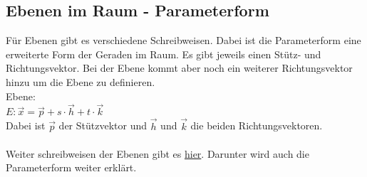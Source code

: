 \subsection{Ebenen im Raum - Parameterform}
Für Ebenen gibt es verschiedene Schreibweisen. 
Dabei ist die Parameterform eine erweiterte Form der Geraden im Raum.
Es gibt jeweils einen Stütz- und Richtungsvektor. 
Bei der Ebene kommt aber noch ein weiterer Richtungsvektor hinzu um die Ebene zu definieren.
\\
Ebene: \\
$
E: \vec{x} = 
\vec{p} + s\cdot\vec{h} + t\cdot\vec{k}
$
\\
Dabei ist $\vec{p}$ der Stützvektor und $\vec{h}$ und $\vec{k}$ die beiden Richtungsvektoren.
\\\\
Weiter schreibweisen der Ebenen gibt es \hyperref[sec:ebenen_formen]{hier}. 
Darunter wird auch die Parameterform weiter erklärt.

